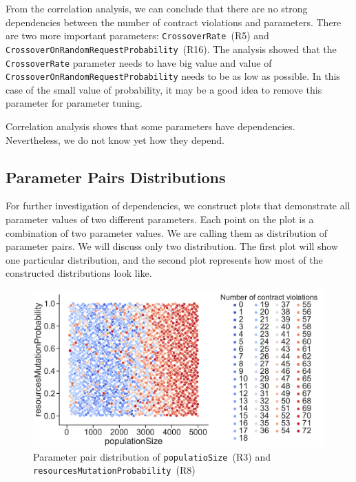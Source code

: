 From the correlation analysis, we can conclude that there are no strong dependencies between the number of contract violations and parameters. There are two more important parameters: \texttt{CrossoverRate}~(R5) and \texttt{Cross\-ov\-er\-On\-Ran\-dom\-Re\-qu\-est\-Pro\-ba\-bi\-li\-ty}~(R16).
The analysis showed that the \texttt{CrossoverRate} parameter needs to have big value and value of \texttt{Cross\-ov\-er\-On\-Ran\-dom\-Re\-qu\-est\-Pro\-ba\-bi\-li\-ty} needs to be as low as possible. In this case of the small value of probability, it may be a good idea to remove this parameter for parameter tuning.

Correlation analysis shows that some parameters have dependencies. Nevertheless, we do not know yet how they depend.

\subsection{Parameter Pairs Distributions}

For further investigation of dependencies, we construct plots that demonstrate all parameter values of two different parameters.
Each point on the plot is a combination of two parameter values. We are calling them as distribution of parameter pairs. We will discuss only two distribution. The first plot will show one particular distribution, and the second plot represents how most of the constructed distributions look like.

\begin{figure}
	\centering
	\includegraphics[width=\textwidth]{images/populatioSizeVsResMutationProbability.pdf}
	\caption[Parameter pair distribution of \texttt{populatioSize}~(R3) and \texttt{re\-so\-ur\-ces\-Mu\-ta\-ti\-on\-Pro\-ba\-bi\-li\-ty}~(R8)]{Parameter pair distribution of \texttt{populatioSize}~(R3) and \texttt{re\-so\-ur\-ces\-Mu\-ta\-ti\-on\-Pro\-ba\-bi\-li\-ty}~(R8)}
	\label{fig:populatioSizeVsResMutationProbability}
\end{figure}

